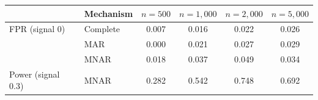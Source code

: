 \begin{tabular}{llcccc}
    \toprule
     & Mechanism & $n{=}500$ & $n{=}1{,}000$ & $n{=}2{,}000$ & $n{=}5{,}000$ \\
    \midrule
    FPR (signal 0)       & Complete  & 0.007 & 0.016 & 0.022 & 0.026 \\
                         & MAR       & 0.000 & 0.021 & 0.027 & 0.029 \\
                         & MNAR      & 0.018 & 0.037 & 0.049 & 0.034 \\
    \midrule
    Power (signal 0.3)   & MNAR      & 0.282 & 0.542 & 0.748 & 0.692 \\
    \bottomrule
\end{tabular}
